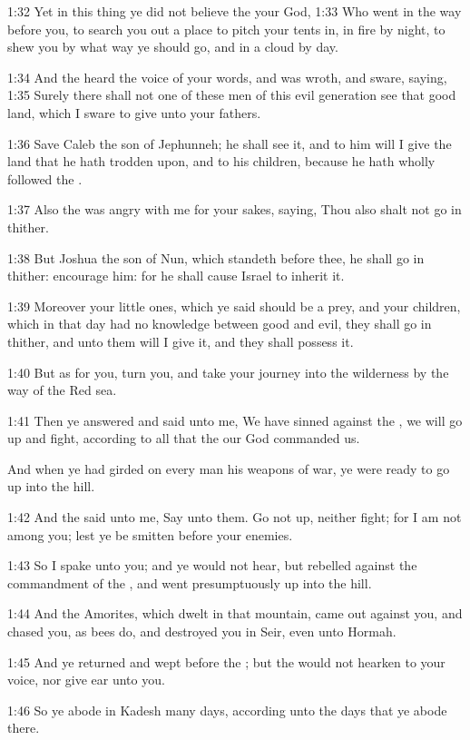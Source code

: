 1:32 Yet in this thing ye did not believe the \LORD your God, 1:33 Who
went in the way before you, to search you out a place to pitch your
tents in, in fire by night, to shew you by what way ye should go, and
in a cloud by day.

1:34 And the \LORD heard the voice of your words, and was wroth, and
sware, saying, 1:35 Surely there shall not one of these men of this
evil generation see that good land, which I sware to give unto your
fathers.

1:36 Save Caleb the son of Jephunneh; he shall see it, and to him will
I give the land that he hath trodden upon, and to his children,
because he hath wholly followed the \LORD.

1:37 Also the \LORD was angry with me for your sakes, saying, Thou also
shalt not go in thither.

1:38 But Joshua the son of Nun, which standeth before thee, he shall
go in thither: encourage him: for he shall cause Israel to inherit it.

1:39 Moreover your little ones, which ye said should be a prey, and
your children, which in that day had no knowledge between good and
evil, they shall go in thither, and unto them will I give it, and they
shall possess it.

1:40 But as for you, turn you, and take your journey into the
wilderness by the way of the Red sea.

1:41 Then ye answered and said unto me, We have sinned against the
\LORD, we will go up and fight, according to all that the \LORD our God
commanded us.

And when ye had girded on every man his weapons of war, ye were ready
to go up into the hill.

1:42 And the \LORD said unto me, Say unto them. Go not up, neither
fight; for I am not among you; lest ye be smitten before your enemies.

1:43 So I spake unto you; and ye would not hear, but rebelled against
the commandment of the \LORD, and went presumptuously up into the hill.

1:44 And the Amorites, which dwelt in that mountain, came out against
you, and chased you, as bees do, and destroyed you in Seir, even unto
Hormah.

1:45 And ye returned and wept before the \LORD; but the \LORD would not
hearken to your voice, nor give ear unto you.

1:46 So ye abode in Kadesh many days, according unto the days that ye
abode there.

